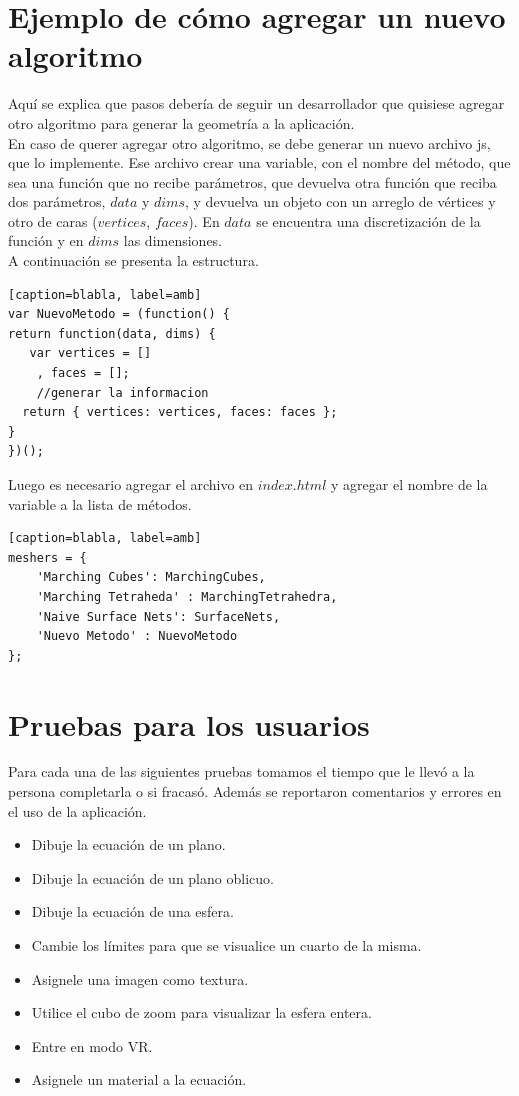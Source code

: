 \documentclass[12pt]{article}
\begin{document}
\section{Ejemplo de cómo agregar un nuevo algoritmo}
Aquí se explica que pasos debería de seguir un desarrollador que quisiese agregar otro algoritmo para generar la geometría a la aplicación.
\\En caso de querer agregar otro algoritmo, se debe generar un nuevo archivo js, que lo implemente. Ese archivo crear una variable, con el nombre del método, que sea una función que no recibe parámetros, que devuelva otra función que reciba dos parámetros, $data$ y $dims$, y devuelva un objeto con un arreglo de vértices y otro de caras ($vertices$, $faces$). En $data$ se encuentra una discretización de la función y en $dims$ las dimensiones.
\\A continuación se presenta la estructura.
\begin{lstlisting}[frame=single][caption=blabla, label=amb]
var NuevoMetodo = (function() {
return function(data, dims) {   
   var vertices = []
    , faces = [];
    //generar la informacion
  return { vertices: vertices, faces: faces };
}
})();
\end{lstlisting}
Luego es necesario agregar el archivo en $index.html$ y agregar el nombre de la variable a la lista de métodos.
\begin{lstlisting}[frame=single][caption=blabla, label=amb]
meshers = {
    'Marching Cubes': MarchingCubes,
    'Marching Tetraheda' : MarchingTetrahedra,
    'Naive Surface Nets': SurfaceNets,
    'Nuevo Metodo' : NuevoMetodo
};
\end{lstlisting}
\clearpage
\section{Pruebas para los usuarios}
Para cada una de las siguientes pruebas tomamos el tiempo que le llevó a la persona completarla o si fracasó. Además se reportaron comentarios y errores en el uso de la aplicación.
\begin{itemize}
\item Dibuje la ecuación de un plano.
\item Dibuje la ecuación de un plano oblicuo.
\item Dibuje la ecuación de una esfera.
\item Cambie los límites para que se visualice un cuarto de la misma.
\item Asignele una imagen como textura.
\item Utilice el cubo de zoom para visualizar la esfera entera.
\item Entre en modo VR.
\item Asignele un material a la ecuación.
\end{itemize}
\end{document}

